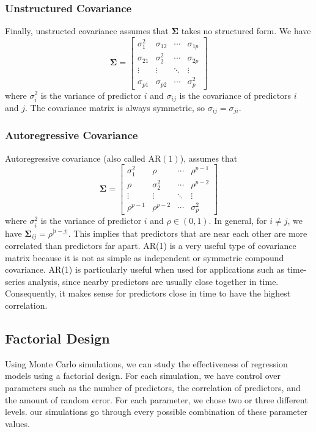 \documentclass{article}
\begin{document}
\subsubsection{Unstructured Covariance}
Finally, unstructed covariance assumes that $\mathbf{\Sigma}$ takes no structured form. We have
\begin{equation}
	\mathbf{\Sigma} = \begin{bmatrix}
		\sigma_1^2 & \sigma_{12} & \cdots & \sigma_{1p}\\
		\sigma_{21} & \sigma_2^2 & \cdots & \sigma_{2p}\\
		\vdots & \vdots & \ddots & \vdots \\
		\sigma_{p1} & \sigma_{p2} & \cdots & \sigma_p^2
	\end{bmatrix}	
\end{equation}
where $\sigma_i^2$ is the variance of predictor $i$ and $\sigma_{ij}$ is the covariance of predictors $i$ and $j$. The covariance matrix is always symmetric, so $\sigma_{ij} = \sigma_{ji}$.

\subsubsection{Autoregressive Covariance}
Autoregressive covariance (also called $\text{AR}(1)$), assumes that
\begin{equation}
	\mathbf{\Sigma} = \begin{bmatrix}
		\sigma_1^2 & \rho & \cdots & \rho^{p - 1}\\
		\rho & \sigma_2^2 & \cdots & \rho^{p - 2}\\
		\vdots & \vdots & \ddots & \vdots\\
		\rho^{p - 1} & \rho^{p - 2} & \cdots & \sigma_p^2
	\end{bmatrix}
\end{equation}
where $\sigma_i^2$ is the variance of predictor $i$ and $\rho \in (0, 1)$. In general, for $i\neq j$, we have $\mathbf{\Sigma}_{ij} = \rho^{\vert i - j\vert}$. This implies that predictors that are near each other are more correlated than predictors far apart. AR(1) is a very useful type of covariance matrix because it is not as simple as independent or symmetric compound covariance. AR(1) is particularly useful when used for applications such as time-series analysis, since nearby predictors are usually close together in time. Consequently, it makes sense for predictors close in time to have the highest correlation.

\subsection{Factorial Design}
Using Monte Carlo simulations, we can study the effectiveness of regression models using a factorial design. For each simulation, we have control over parameters such as the number of predictors, the correlation of predictors, and the amount of random error. For each parameter, we chose two or three different levels. our simulations  go through every possible combination of these parameter values.
\end{document}
